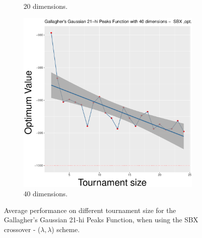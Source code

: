\begin{figure}[t]
\begin{subfigure}[b]{0.33\textwidth}
		\caption{20 dimensions.}
	\end{subfigure}
	\begin{subfigure}[b]{0.33\textwidth}
		\centering
		\includegraphics[width=\textwidth]{img/SBX-40D/multimodal_sbx_22_dim_40.pdf}
		\caption{40 dimensions.}
	\end{subfigure}
	\caption{Average performance on different tournament size for the Gallagher's Gaussian 21-hi Peaks Function, when using the SBX crossover - ($\lambda, \lambda$) scheme.}
	\label{sbx-22-a}
\end{figure}

